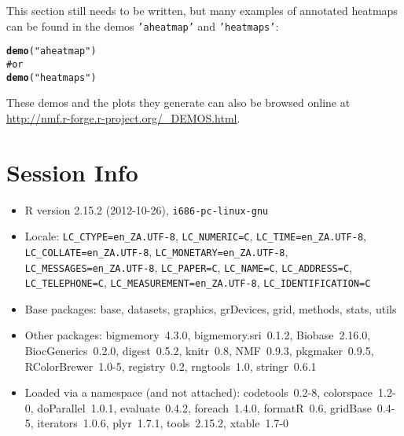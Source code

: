 \documentclass[a4paper]{article}\usepackage{graphicx, color}
\makeatletter
\newcommand{\hlfunctioncall}[1]{\textcolor[rgb]{0.501960784313725,0,0.329411764705882}{\textbf{#1}}}%
\newcommand{\hlstring}[1]{\textcolor[rgb]{0.6,0.6,1}{#1}}%
\newcommand{\hlcomment}[1]{\textcolor[rgb]{0.180392156862745,0.6,0.341176470588235}{#1}}%
\newenvironment{kframe}{%
 \def\at@end@of@kframe{}%
 \ifinner\ifhmode%
  \def\at@end@of@kframe{\end{minipage}}%
  \begin{minipage}{\columnwidth}%
 \fi\fi%
 \def\FrameCommand##1{\hskip\@totalleftmargin \hskip-\fboxsep
 \colorbox{shadecolor}{##1}\hskip-\fboxsep
     \hskip-\linewidth \hskip-\@totalleftmargin \hskip\columnwidth}%
 \MakeFramed {\advance\hsize-\width
   \@totalleftmargin\z@ \linewidth\hsize
   \@setminipage}}%
 {\par\unskip\endMakeFramed%
 \at@end@of@kframe}
\newenvironment{knitrout}{}{} %
\let\code=\texttt
\makeatother
\begin{document}
This section still needs to be written, but many examples of annotated heatmaps can be found in the demos \code{'aheatmap'} and \code{'heatmaps'}:
\begin{knitrout}
\color{fgcolor}\begin{kframe}
\begin{alltt}
\hlfunctioncall{demo}(\hlstring{"aheatmap"})
\hlcomment{# or}
\hlfunctioncall{demo}(\hlstring{"heatmaps"})
\end{alltt}
\end{kframe}
\end{knitrout}


These demos and the plots they generate can also be browsed online at \url{http://nmf.r-forge.r-project.org/_DEMOS.html}.

\section{Session Info}

\begin{itemize}\raggedright
  \item R version 2.15.2 (2012-10-26), \verb|i686-pc-linux-gnu|
  \item Locale: \verb|LC_CTYPE=en_ZA.UTF-8|, \verb|LC_NUMERIC=C|, \verb|LC_TIME=en_ZA.UTF-8|, \verb|LC_COLLATE=en_ZA.UTF-8|, \verb|LC_MONETARY=en_ZA.UTF-8|, \verb|LC_MESSAGES=en_ZA.UTF-8|, \verb|LC_PAPER=C|, \verb|LC_NAME=C|, \verb|LC_ADDRESS=C|, \verb|LC_TELEPHONE=C|, \verb|LC_MEASUREMENT=en_ZA.UTF-8|, \verb|LC_IDENTIFICATION=C|
  \item Base packages: base, datasets, graphics, grDevices, grid,
    methods, stats, utils
  \item Other packages: bigmemory~4.3.0, bigmemory.sri~0.1.2,
    Biobase~2.16.0, BiocGenerics~0.2.0, digest~0.5.2, knitr~0.8,
    NMF~0.9.3, pkgmaker~0.9.5, RColorBrewer~1.0-5, registry~0.2,
    rngtools~1.0, stringr~0.6.1
  \item Loaded via a namespace (and not attached):
    codetools~0.2-8, colorspace~1.2-0, doParallel~1.0.1,
    evaluate~0.4.2, foreach~1.4.0, formatR~0.6, gridBase~0.4-5,
    iterators~1.0.6, plyr~1.7.1, tools~2.15.2, xtable~1.7-0
\end{itemize}




\printbibliography[heading=bibintoc]
\end{document}
